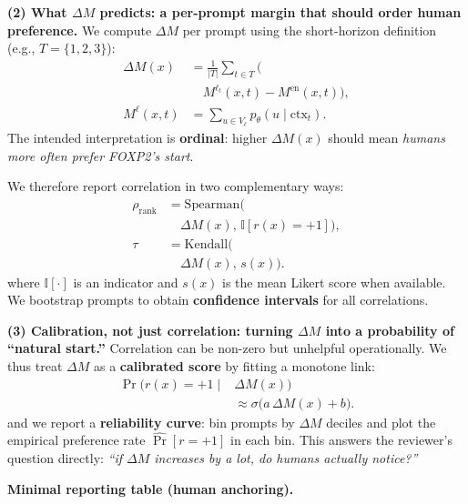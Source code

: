\begin{itemize}[leftmargin=1.5em]
\begin{description}
\vspace{6pt}
\textbf{(2) What $\Delta M$ predicts: a per-prompt margin that should order human preference.}
We compute $\Delta M$ per prompt using the short-horizon definition (e.g., $T=\{1,2,3\}$):
\begin{equation*}
\begin{aligned}
\Delta M(x)
&= \frac{1}{|T|}
   \sum_{t \in T} \Big( \\
&\quad M^{\ell_t}(x,t)
      - M^{\mathrm{en}}(x,t) \Big), \\
M^{\ell}(x,t)
&= \sum_{u \in V_\ell}
   p_\theta(u \mid \mathrm{ctx}_t).
\end{aligned}
\end{equation*}
The intended interpretation is \textbf{ordinal}: higher $\Delta M(x)$ should mean \emph{humans more often prefer FOXP2’s start}.

We therefore report correlation in two complementary ways:
\begin{equation*}
\begin{aligned}
\rho_{\mathrm{rank}}
&= \mathrm{Spearman}\big( \\
&\quad \Delta M(x),\,
      \mathbb{I}[r(x)=+1] \big), \\
\tau
&= \mathrm{Kendall}\big( \\
&\quad \Delta M(x),\, s(x) \big).
\end{aligned}
\end{equation*}
where $\mathbb{I}[\cdot]$ is an indicator and $s(x)$ is the mean Likert score when available. We bootstrap prompts to obtain \textbf{confidence intervals} for all correlations.

\vspace{6pt}
\textbf{(3) Calibration, not just correlation: turning $\Delta M$ into a probability of “natural start.”}
Correlation can be non-zero but unhelpful operationally. We thus treat $\Delta M$ as a \textbf{calibrated score} by fitting a monotone link:
\[
\begin{aligned}
\Pr\big(r(x)=+1 \mid {} & \Delta M(x)\big) \\
&\approx \sigma\!\big(a\,\Delta M(x)+b\big).
\end{aligned}
\]
and we report a \textbf{reliability curve}: bin prompts by $\Delta M$ deciles and plot the empirical preference rate $\widehat{\Pr}[r=+1]$ in each bin. This answers the reviewer’s question directly: \emph{“if $\Delta M$ increases by a lot, do humans actually notice?”}


\vspace{4pt}
\textbf{Minimal reporting table (human anchoring).}


\end{description}
\end{itemize}
